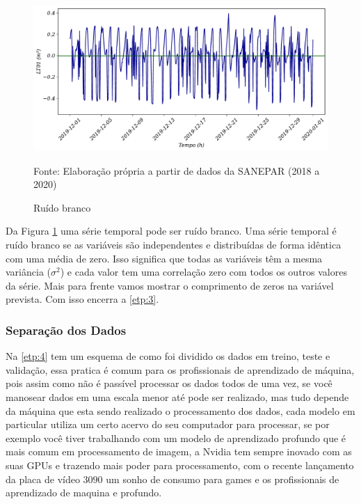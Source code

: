 \begin{figure}[H]
	\centering
	\caption{Ruído branco}
	\label{fig:ruido-branco}
	\includegraphics[width=1\linewidth]{Resultados/Figuras/ruido-branco}
	
	Fonte: Elaboração própria a partir de dados da SANEPAR (2018 a 2020)
\end{figure}

Da Figura \ref{fig:ruido-branco} uma série temporal pode ser ruído branco.
Uma série temporal é ruído branco se as variáveis são independentes e distribuídas de forma idêntica com uma média de zero.
Isso significa que todas as variáveis têm a mesma variância ($\sigma^2$) e cada valor tem uma correlação zero com todos os outros valores da série.
Mais para frente vamos mostrar o comprimento de zeros na variável prevista. Com isso encerra a \ref{etp:3}.

\subsubsection{Separa\c c\~ao dos Dados}

Na \ref{etp:4} tem um esquema de como foi dividido os dados em treino, teste e validação, essa pratica é comum para os profissionais de aprendizado de máquina, pois assim como não é passível processar os dados todos de uma vez, se você manosear dados em uma escala menor até pode ser realizado, mas tudo depende da máquina que esta sendo realizado o processamento dos dados, cada modelo em particular utiliza um certo acervo do seu computador para processar, se por exemplo você tiver trabalhando com um modelo de aprendizado profundo que é mais comum em processamento de imagem, a Nvidia tem sempre inovado com as suas GPUs e trazendo mais poder para processamento, com o recente lançamento da placa de vídeo $3090$ um sonho de consumo para games e os profissionais de aprendizado de maquina e profundo.

